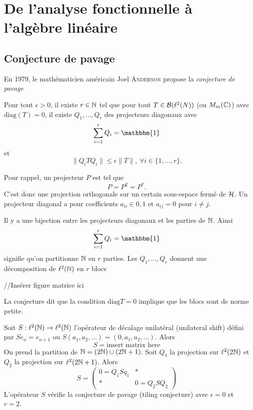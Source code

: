 
\chapter{De l'analyse fonctionnelle à l'algèbre linéaire}
\label{sec:chap2}


\section{Conjecture de pavage}
\label{sec:conjecture-de-pavage}

En 1979, le mathématicien américain Joel \textsc{Anderson} propose la \emph{conjecture de pavage}

\begin{conj}
  Pour tout $\epsilon > 0$, il existe $r \in \mathbb{N}$ tel que pour tout $T \in \mathcal{B}(\ell^2(N))$ (ou $M_m(\mathbb{C})$) avec
  $\mathrm{diag}(T) = 0$, il existe $Q_1, \ldots, Q_r$ des projecteurs diagonaux avec 
  \[ \sum_{i=1}^{r} Q_i = \mathbbm{1} \]
  et 
  \[ \|Q_iTQ_i\|  \leq \epsilon \|T\|, \ \forall i \in \{1, \ldots, r\}. \]
\end{conj}

Pour rappel, un projecteur $P$ est tel que 
\[ P = P^2 = P^\ast. \]
C'est donc une projection orthogonale sur un certain sous-espace fermé de $\mathcal{H}$. Un projecteur diagonal a pour coefficients $a_{ii} \in {0, 1}$ et $a_{ij} = 0$ pour $i \neq j$.

Il y a une bijection entre les projecteurs diagonaux et les parties de $\mathbb{N}$. Ainsi 
\[ \sum_{i = 1}^{r} Q_i = \mathbbm{1} \]
signifie qu'on partitionne $\mathbb{N}$ en $r$ parties. Les $Q_1, \ldots, Q_r$ donnent une décomposition de
$\ell^2(\mathbb{N})$ en $r$ blocs

//Insérer figure matrice ici

La conjecture dit que la condition $\mathrm{diag}T = 0$ implique que les blocs sont de norme petite.

\begin{ex}
Soit $S: \ell^2(\mathbb{N}) \to \ell^2(\mathbb{N})$ l'opérateur de décalage
  unilatéral (\og unilateral shift\fg{}) défini par $Se_n = e_{n+1}$ ou
  $S(a_1, a_2, \ldots) = (0, a_1, a_2, \ldots)$. Alors
  \[ S = \text{insert matrix here} \] On prend la partition de $\mathbb{N} = (2\mathbb{N}) \cup (2\mathbb{N} + 1)$. Soit $Q_1$ la
  projection sur $\ell^2(2\mathbb{N})$ et $Q_2$ la projection sur $\ell^2 (2\mathbb{N} + 1)$. Alors 
  \[ S =
    \begin{pmatrix}
      0 = Q_1Sq_1 & \ast \\ \ast & 0 = Q_2SQ_2
    \end{pmatrix}
  \]
  L'opérateur $S$ vérifie la conjecture de pavage (\og tiling conjecture\fg{}) avec $\epsilon = 0$ et $r = 2$.
\end{ex}

